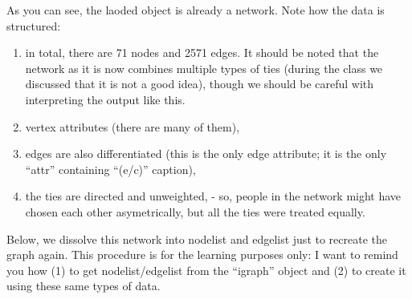\documentclass[
]{book}
\begin{document}
As you can see, the laoded object is already a network. Note how the data is structured:

\begin{enumerate}
\def\labelenumi{(\arabic{enumi})}
\item
  in total, there are 71 nodes and 2571 edges. It should be noted that the network as it is now combines multiple types of ties (during the class we discussed that it is not a good idea), though we should be careful with interpreting the output like this.
\item
  vertex attributes (there are many of them),
\item
  edges are also differentiated (this is the only edge attribute; it is the only ``attr'' containing ``(e/c)'' caption),
\item
  the ties are directed and unweighted, - so, people in the network might have chosen each other asymetrically, but all the ties were treated equally.
\end{enumerate}

Below, we dissolve this network into nodelist and edgelist just to recreate the graph again. This procedure is for the learning purposes only: I want to remind you how (1) to get nodelist/edgelist from the ``igraph'' object and (2) to create it using these same types of data.
\end{document}

